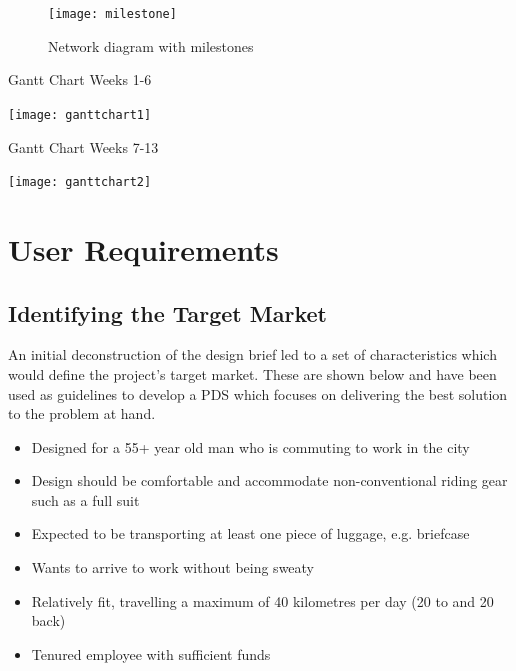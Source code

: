 \documentclass[a4paper,11pt]{article}
\begin{document}
\vspace{0.5em}
\begin{figure}[ht]
	\centering
	\texttt{[image: milestone]}
	\caption{Network diagram with milestones}
	\label{fig:net}
\end{figure}

\thispagestyle{empty}
\begin{landscape}

\vspace*{\fill} 
\begin{table}[!ht]
	\centering
	\caption{Gantt Chart Weeks 1-6}
	\texttt{[image: ganttchart1]}
	\label{tab:gtc1}
\end{table}
\vspace*{\fill} 

\newpage

\vspace*{\fill} 
\begin{table}[!ht]
	\centering
	\caption{Gantt Chart Weeks 7-13}
	\texttt{[image: ganttchart2]}
	\label{tab:gtc2}
\end{table}
\vspace*{\fill}
\end{landscape}
\restoregeometry

\section{User Requirements}


\subsection{Identifying the Target Market}

An initial deconstruction of the design brief led to a set of characteristics which would define the project's target market. These are shown below and have been used as guidelines to develop a PDS which focuses on delivering the best solution to the problem at hand.

\begin{itemize}
	\setlength{\itemsep}{0pt}
	\item Designed for a 55+ year old man who is commuting to work in the city
	\item Design should be comfortable and accommodate non-conventional riding gear such as a full suit
	\item Expected to be transporting at least one piece of luggage, e.g. briefcase
	\item Wants to arrive to work without being sweaty
	\item Relatively fit, travelling a maximum of 40 kilometres per day (20 to and 20 back)
	\item Tenured employee with sufficient funds
\end{itemize}
\end{document}
